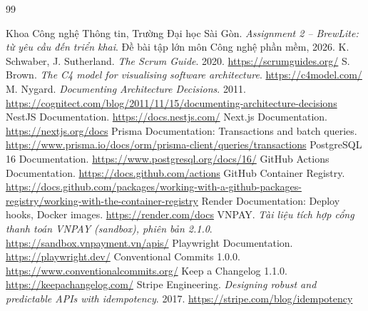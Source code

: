 {\small\begin{thebibliography}{99}\setlength{\itemsep}{0pt}\setlength{\parskip}{0pt}
 Khoa Công nghệ Thông tin, Trường Đại học Sài Gòn. \textit{Assignment 2 -- BrewLite: từ yêu cầu đến triển khai}. Đề bài tập lớn môn Công nghệ phần mềm, 2026.
 K. Schwaber, J. Sutherland. \textit{The Scrum Guide}. 2020. \url{https://scrumguides.org/}
 S. Brown. \textit{The C4 model for visualising software architecture}. \url{https://c4model.com/}
 M. Nygard. \textit{Documenting Architecture Decisions}. 2011. \url{https://cognitect.com/blog/2011/11/15/documenting-architecture-decisions}
 NestJS Documentation. \url{https://docs.nestjs.com/}
 Next.js Documentation. \url{https://nextjs.org/docs}
 Prisma Documentation: Transactions and batch queries. \url{https://www.prisma.io/docs/orm/prisma-client/queries/transactions}
 PostgreSQL 16 Documentation. \url{https://www.postgresql.org/docs/16/}
 GitHub Actions Documentation. \url{https://docs.github.com/actions}
 GitHub Container Registry. \url{https://docs.github.com/packages/working-with-a-github-packages-registry/working-with-the-container-registry}
 Render Documentation: Deploy hooks, Docker images. \url{https://render.com/docs}
 VNPAY. \textit{Tài liệu tích hợp cổng thanh toán VNPAY (sandbox), phiên bản 2.1.0}. \url{https://sandbox.vnpayment.vn/apis/}
 Playwright Documentation. \url{https://playwright.dev/}
 Conventional Commits 1.0.0. \url{https://www.conventionalcommits.org/}
 Keep a Changelog 1.1.0. \url{https://keepachangelog.com/}
 Stripe Engineering. \textit{Designing robust and predictable APIs with idempotency}. 2017. \url{https://stripe.com/blog/idempotency}
\end{thebibliography}}
\clearpage
